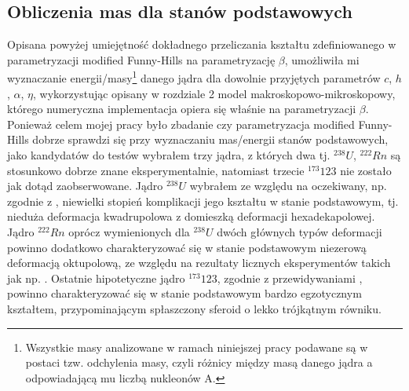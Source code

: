 \documentclass[a4paper,polish,twoside]{article}
\numberwithin{equation}{section}
\begin{document}
\clearpage
\subsection{Obliczenia mas dla stanów podstawowych}

Opisana powyżej umiejętność dokładnego przeliczania kształtu zdefiniowanego w parametryzacji modified Funny-Hills na parametryzację $\beta$, umożliwiła mi wyznaczanie energii/masy\footnote{Wszystkie masy analizowane w ramach niniejszej pracy podawane są w postaci tzw. odchylenia masy, czyli różnicy między masą danego jądra a odpowiadającą mu liczbą nukleonów A.} danego jądra dla dowolnie przyjętych parametrów $c$, $h$, $\alpha$, $\eta$, wykorzystując opisany w rozdziale 2 model makroskopowo-mikroskopowy, którego numeryczna implementacja opiera się właśnie na parametryzacji $\beta$. Ponieważ celem mojej pracy było zbadanie czy parametryzacja modified Funny-Hills dobrze sprawdzi się przy wyznaczaniu mas/energii stanów podstawowych, jako kandydatów do testów wybrałem trzy jądra, z których dwa tj. $^{238}U$, $^{222}Rn$ są stosunkowo dobrze znane eksperymentalnie, natomiast trzecie $^{173}123$ nie zostało jak dotąd zaobserwowane. Jądro $^{238}U$ wybrałem ze względu na oczekiwany, np. zgodnie z \cite{RIPL3}, niewielki stopień komplikacji jego kształtu w stanie podstawowym, tj. nieduża deformacja kwadrupolowa z domieszką deformacji hexadekapolowej. Jądro $^{222}Rn$ oprócz wymienionych dla $^{238}U$ dwóch głównych typów deformacji powinno dodatkowo charakteryzować się w stanie podstawowym niezerową deformacją oktupolową, ze względu na rezultaty licznych eksperymentów takich jak np. \cite{E3}. Ostatnie hipotetyczne jądro $^{173}123$, zgodnie z przewidywaniami \cite{A32}, powinno charakteryzować się w stanie podstawowym bardzo egzotycznym kształtem, przypominającym spłaszczony sferoid o lekko trójkątnym równiku. 
\end{document}

